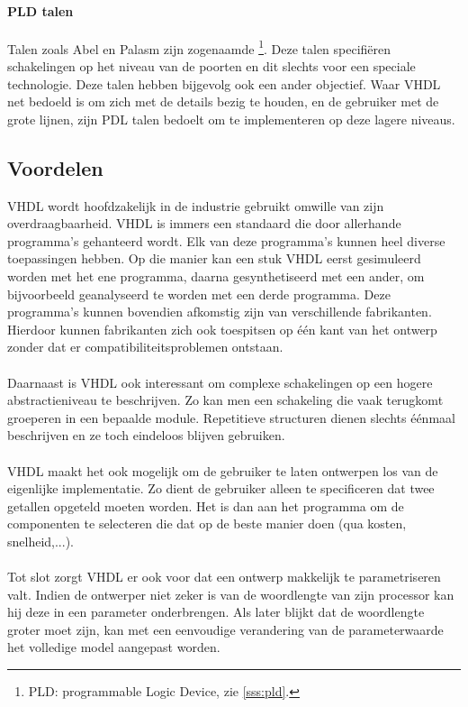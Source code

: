 \paragraph{PLD talen}
Talen zoals Abel en Palasm zijn zogenaamde \footnote{PLD: programmable Logic Device, zie \ref{sss:pld}.}. Deze talen specifi\"eren schakelingen op het niveau van de poorten en dit slechts voor een speciale technologie. Deze talen hebben bijgevolg ook een ander objectief. Waar VHDL net bedoeld is om zich met de details bezig te houden, en de gebruiker met de grote lijnen, zijn PDL talen bedoelt om te implementeren op deze lagere niveaus.
\subsection{Voordelen}
VHDL wordt hoofdzakelijk in de industrie gebruikt omwille van zijn overdraagbaarheid. VHDL is immers een standaard die door allerhande programma's gehanteerd wordt. Elk van deze programma's kunnen heel diverse toepassingen hebben. Op die manier kan een stuk VHDL eerst gesimuleerd worden met het ene programma, daarna gesynthetiseerd met een ander, om bijvoorbeeld geanalyseerd te worden met een derde programma. Deze programma's kunnen bovendien afkomstig zijn van verschillende fabrikanten. Hierdoor kunnen fabrikanten zich ook toespitsen op \'e\'en kant van het ontwerp zonder dat er compatibiliteitsproblemen ontstaan.
\paragraph{}
Daarnaast is VHDL ook interessant om complexe schakelingen op een hogere abstractieniveau te beschrijven. Zo kan men een schakeling die vaak terugkomt groeperen in een bepaalde module. Repetitieve structuren dienen slechts \'e\'enmaal beschrijven en ze toch eindeloos blijven gebruiken.
\paragraph{}
VHDL maakt het ook mogelijk om de gebruiker te laten ontwerpen los van de eigenlijke implementatie. Zo dient de gebruiker alleen te specificeren dat twee getallen opgeteld moeten worden. Het is dan aan het programma om de componenten te selecteren die dat op de beste manier doen (qua kosten, snelheid,...).
\paragraph{}
Tot slot zorgt VHDL er ook voor dat een ontwerp makkelijk te parametriseren valt. Indien de ontwerper niet zeker is van de woordlengte van zijn processor kan hij deze in een parameter onderbrengen. Als later blijkt dat de woordlengte groter moet zijn, kan met een eenvoudige verandering van de parameterwaarde het volledige model aangepast worden.
